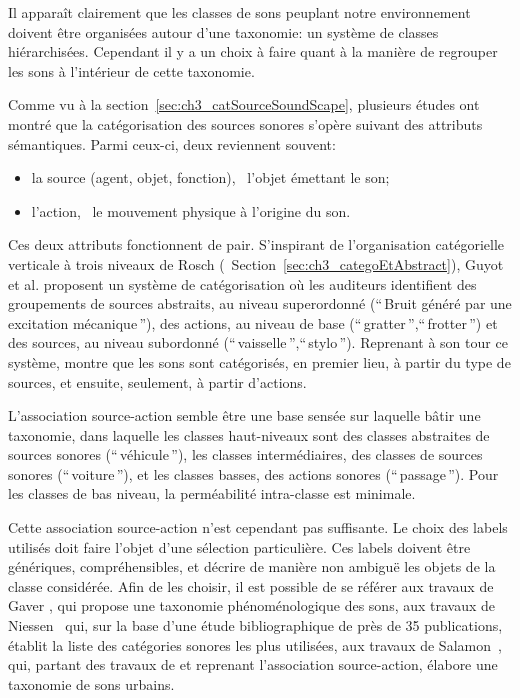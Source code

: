 Il apparaît clairement que les classes de sons peuplant notre environnement doivent être organisées autour d'une taxonomie: un système de classes hiérarchisées. Cependant il y a un choix à faire quant à la manière de regrouper les sons à l'intérieur de cette taxonomie.

Comme vu à la section~\ref{sec:ch3_catSourceSoundScape}, plusieurs études ont montré que la catégorisation des sources sonores s'opère suivant des attributs sémantiques. Parmi ceux-ci, deux reviennent souvent:

\begin{itemize}
\item la source (agent, objet, fonction), \ie~l'objet émettant le son;
\item l'action, \ie~le mouvement physique à l'origine du son.
\end{itemize} 

Ces deux attributs fonctionnent de pair. S'inspirant de l'organisation catégorielle verticale à trois niveaux de Rosch (\cf~Section~\ref{sec:ch3_categoEtAbstract}), Guyot et al. \citep{guyot1997} proposent un système de catégorisation où les auditeurs identifient des groupements de sources abstraits, au niveau superordonné (``\,Bruit généré par une excitation mécanique\,''), des actions, au niveau de base (``\,gratter\,'',``\,frotter\,'') et des sources, au niveau subordonné (``\,vaisselle\,'',``\,stylo\,''). Reprenant à son tour ce système, \citep{houix_lexical_2012} montre que les sons sont catégorisés, en premier lieu, à partir du type de sources, et ensuite, seulement, à partir d'actions.

L'association source-action semble être une base sensée sur laquelle bâtir une taxonomie, dans laquelle les classes haut-niveaux sont des classes abstraites de sources sonores (``\,véhicule\,''), les classes intermédiaires, des classes de sources sonores (``\,voiture\,''), et les classes basses, des actions sonores (``\,passage\,''). Pour les classes de bas niveau, la perméabilité intra-classe est minimale.

Cette association source-action n'est cependant pas suffisante. Le choix des labels utilisés doit faire l'objet d'une sélection particulière. Ces labels doivent être génériques, compréhensibles, et décrire de manière non ambiguë les objets de la classe considérée. Afin de les choisir, il est possible de se référer aux travaux de Gaver \citep{gaver1993world}, qui propose une taxonomie phénoménologique des sons, aux travaux de Niessen~\al \citep{niessen2010categories} qui, sur la base d'une étude bibliographique de près de 35 publications, établit la liste des catégories sonores les plus utilisées, aux travaux de Salamon~\al \citep{Salamon14}, qui, partant des travaux de \citep{brown2011towards} et reprenant l'association source-action, élabore une taxonomie de sons urbains.

